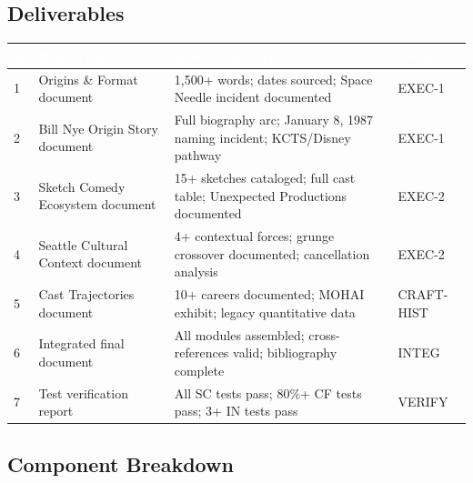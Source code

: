 \documentclass[11pt,letterpaper]{article}
\newcommand{\tableheader}[1]{\textbf{\sffamily\textcolor{white}{#1}}}
\begin{document}
\subsection{Deliverables}

\begin{center}
\begin{tabularx}{\textwidth}{C{0.5cm}L{3.5cm}L{5cm}L{3cm}}
\toprule
{}
\tableheader{\#} & \tableheader{Deliverable} & \tableheader{Acceptance Criteria} & \tableheader{Owner} \\
 & Origins \& Format document & 1,500+ words; dates sourced; Space Needle incident documented & EXEC-1 \\
2 & Bill Nye Origin Story document & Full biography arc; January 8, 1987 naming incident; KCTS/Disney pathway & EXEC-1 \\
3 & Sketch Comedy Ecosystem document & 15+ sketches cataloged; full cast table; Unexpected Productions documented & EXEC-2 \\
4 & Seattle Cultural Context document & 4+ contextual forces; grunge crossover documented; cancellation analysis & EXEC-2 \\
5 & Cast Trajectories document & 10+ careers documented; MOHAI exhibit; legacy quantitative data & CRAFT-HIST \\
6 & Integrated final document & All modules assembled; cross-references valid; bibliography complete & INTEG \\
7 & Test verification report & All SC tests pass; 80\%+ CF tests pass; 3+ IN tests pass & VERIFY \\
\bottomrule
\end{tabularx}
\end{center}

\subsection{Component Breakdown}
\end{document}
